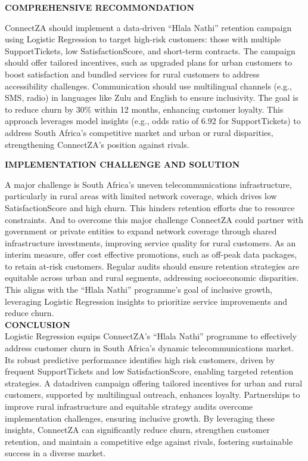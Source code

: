 \documentclass[
]{article}
\begin{document}
\textbf{COMPREHENSIVE RECOMMONDATION}

ConnectZA should implement a data-driven ``Hlala Nathi'' retention
campaign using Logistic Regression to target high-risk customers: those
with multiple SupportTickets, low SatisfactionScore, and short-term
contracts. The campaign should offer tailored incentives, such as
upgraded plans for urban customers to boost satisfaction and bundled
services for rural customers to address accessibility challenges.
Communication should use multilingual channels (e.g., SMS, radio) in
languages like Zulu and English to ensure inclusivity. The goal is to
reduce churn by 30\% within 12 months, enhancing customer loyalty. This
approach leverages model insights (e.g., odds ratio of 6.92 for
SupportTickets) to address South Africa's competitive market and urban
or rural disparities, strengthening ConnectZA's position against rivals.

\textbf{IMPLEMENTATION CHALLENGE AND SOLUTION}

A major challenge is South Africa's uneven telecommunications
infrastructure, particularly in rural areas with limited network
coverage, which drives low SatisfactionScore and high churn. This
hinders retention efforts due to resource constraints. And to overcome
this major challenge ConnectZA could partner with government or private
entities to expand network coverage through shared infrastructure
investments, improving service quality for rural customers. As an
interim measure, offer cost effective promotions, such as off-peak data
packages, to retain at-risk customers. Regular audits should ensure
retention strategies are equitable across urban and rural segments,
addressing socioeconomic disparities. This aligns with the ``Hlala
Nathi'' programme's goal of inclusive growth, leveraging Logistic
Regression insights to prioritize service improvements and reduce
churn.\\

\textbf{CONCLUSION}\\

Logistic Regression equips ConnectZA's ``Hlala Nathi'' programme to
effectively address customer churn in South Africa's dynamic
telecommunications market. Its robust predictive performance identifies
high risk customers, driven by frequent SupportTickets and low
SatisfactionScore, enabling targeted retention strategies. A datadriven
campaign offering tailored incentives for urban and rural customers,
supported by multilingual outreach, enhances loyalty. Partnerships to
improve rural infrastructure and equitable strategy audits overcome
implementation challenges, ensuring inclusive growth. By leveraging
these insights, ConnectZA can significantly reduce churn, strengthen
customer retention, and maintain a competitive edge against rivals,
fostering sustainable success in a diverse market.
\end{document}
